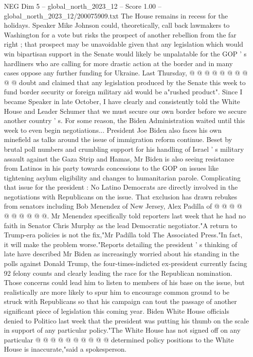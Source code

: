 \begin{textsample}{NEG Dim 5 – global\_north\_2023\_12 – Score 1.00 – global\_north\_2023\_12/200075909.txt}
The House remains in recess for the holidays.
Speaker Mike Johnson could, theoretically, call back lawmakers to Washington for a vote but risks the prospect of another rebellion from the far right ; that prospect may be unavoidable given that any legislation which would win bipartisan support in the Senate would likely be unpalatable for the GOP ' s hardliners who are calling for more drastic action at the border and in many cases oppose any further funding for Ukraine.
Last Thursday, @ @ @ @ @ @ @ @ @ @ doubt and claimed that any legislation produced by the Senate this week to fund border security or foreign military aid would be a"rushed product".
Since I became Speaker in late October, I have clearly and consistently told the White House and Leader Schumer that we must secure our own border before we secure another country ' s.
For some reason, the Biden Administration waited until this week to even begin negotiations...
President Joe Biden also faces his own minefield as talks around the issue of immigration reform continue.
Beset by brutal poll numbers and crumbling support for his handling of Israel ' s military assault against the Gaza Strip and Hamas, Mr Biden is also seeing resistance from Latinos in his party towards concessions to the GOP on issues like tightening asylum eligibility and changes to humanitarian parole.
Complicating that issue for the president : No Latino Democrats are directly involved in the negotiations with Republicans on the issue.
That exclusion has drawn rebukes from senators including Bob Menendez of New Jersey, Alex Padilla of @ @ @ @ @ @ @ @ @ @.
Mr Menendez specifically told reporters last week that he had no faith in Senator Chris Murphy as the lead Democratic negotiator."A return to Trump-era policies is not the fix,"Mr Padilla told The Associated Press."In fact, it will make the problem worse."Reports detailing the president ' s thinking of late have described Mr Biden as increasingly worried about his standing in the polls against Donald Trump, the four-times-indicted ex-president currently facing 92 felony counts and clearly leading the race for the Republican nomination.
Those concerns could lead him to listen to members of his base on the issue, but realistically are more likely to spur him to encourage common ground to be struck with Republicans so that his campaign can tout the passage of another significant piece of legislation this coming year.
Biden White House officials denied to Politico last week that the president was putting his thumb on the scale in support of any particular policy."The White House has not signed off on any particular @ @ @ @ @ @ @ @ @ @ determined policy positions to the White House is inaccurate,"said a spokesperson.

\end{textsample}
